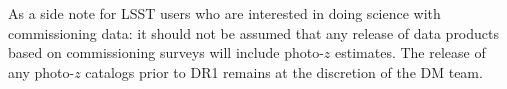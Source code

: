 \documentclass[DM,lsstdraft,toc]{lsstdoc}
\begin{document}
As a side note for LSST users who are interested in doing science with commissioning data: it should not be assumed that any release of data products based on commissioning surveys will include photo-$z$ estimates.
The release of any photo-$z$ catalogs prior to DR1 remains at the discretion of the DM team.




\clearpage


\clearpage
\appendix 

\end{document}
